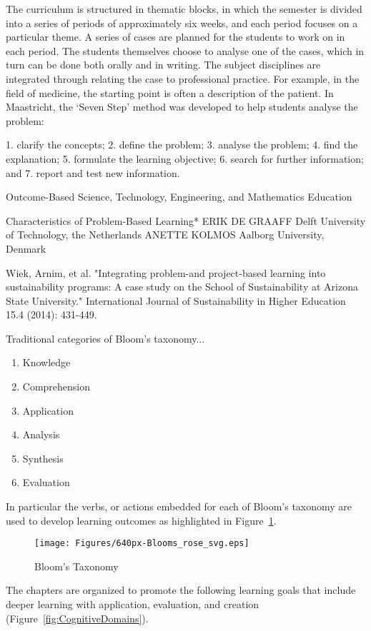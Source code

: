 \documentclass{tufte-book}\usepackage[]{graphicx}\usepackage[]{xcolor}
\begin{document}
The curriculum is structured in thematic blocks, in which the semester is divided into a series of periods of approximately six weeks, and each period focuses on a particular theme. A series of cases are planned for the students to work on in each period. The students themselves choose to analyse one of the cases, which in turn can be done both orally and in writing. The subject disciplines are integrated through relating the case to professional practice. For example, in the field of medicine, the starting point is often a description of the patient. In Maastricht, the `Seven Step' method was developed to help students analyse the problem:

1. clarify the concepts;
2. define the problem;
3. analyse the problem;
4. find the explanation;
5. formulate the learning objective;
6. search for further information; and
7. report and test new information.

Outcome-Based Science, Technology, Engineering, and Mathematics Education


 Characteristics of Problem-Based
Learning*
ERIK DE GRAAFF
Delft University of Technology, the Netherlands
ANETTE KOLMOS
Aalborg University, Denmark


Wiek, Arnim, et al. "Integrating problem-and project-based learning into sustainability programs: A case study on the School of Sustainability at Arizona State University." International Journal of Sustainability in Higher Education 15.4 (2014): 431-449.

Traditional categories of Bloom's taxonomy...
\begin{enumerate}
	\item Knowledge
	\item Comprehension
	\item Application
	\item Analysis
	\item Synthesis
	\item Evaluation
\end{enumerate}

In particular the verbs, or actions embedded for each of Bloom's taxonomy are used to develop learning outcomes as highlighted in Figure~\ref{fig:Bloom}.

\begin{figure}
	\centering
		\texttt{[image: Figures/640px-Blooms\_rose\_svg.eps]}
	\caption{Bloom's Taxonomy}
	\label{fig:Bloom}
\end{figure}

The chapters are organized to promote the following learning goals that include deeper learning with application, evaluation, and creation (Figure~\ref{fig:CognitiveDomains}).
\end{document}

